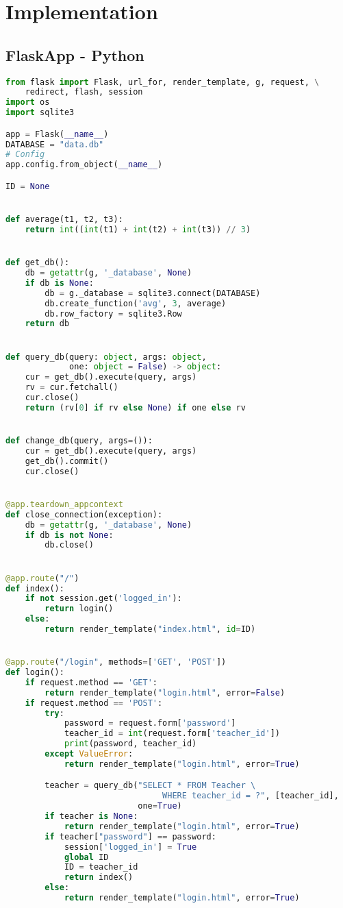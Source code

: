 \chapter{Implementation}

\section{FlaskApp - Python}

\begin{lstlisting}[language=python]
from flask import Flask, url_for, render_template, g, request, \
    redirect, flash, session
import os
import sqlite3

app = Flask(__name__)
DATABASE = "data.db"
# Config
app.config.from_object(__name__)

ID = None


def average(t1, t2, t3):
    return int((int(t1) + int(t2) + int(t3)) // 3)


def get_db():
    db = getattr(g, '_database', None)
    if db is None:
        db = g._database = sqlite3.connect(DATABASE)
        db.create_function('avg', 3, average)
        db.row_factory = sqlite3.Row
    return db


def query_db(query: object, args: object,
             one: object = False) -> object:
    cur = get_db().execute(query, args)
    rv = cur.fetchall()
    cur.close()
    return (rv[0] if rv else None) if one else rv


def change_db(query, args=()):
    cur = get_db().execute(query, args)
    get_db().commit()
    cur.close()


@app.teardown_appcontext
def close_connection(exception):
    db = getattr(g, '_database', None)
    if db is not None:
        db.close()


@app.route("/")
def index():
    if not session.get('logged_in'):
        return login()
    else:
        return render_template("index.html", id=ID)


@app.route("/login", methods=['GET', 'POST'])
def login():
    if request.method == 'GET':
        return render_template("login.html", error=False)
    if request.method == 'POST':
        try:
            password = request.form['password']
            teacher_id = int(request.form['teacher_id'])
            print(password, teacher_id)
        except ValueError:
            return render_template("login.html", error=True)

        teacher = query_db("SELECT * FROM Teacher \
                                WHERE teacher_id = ?", [teacher_id],
                           one=True)
        if teacher is None:
            return render_template("login.html", error=True)
        if teacher["password"] == password:
            session['logged_in'] = True
            global ID
            ID = teacher_id
            return index()
        else:
            return render_template("login.html", error=True)



\end{lstlisting}
